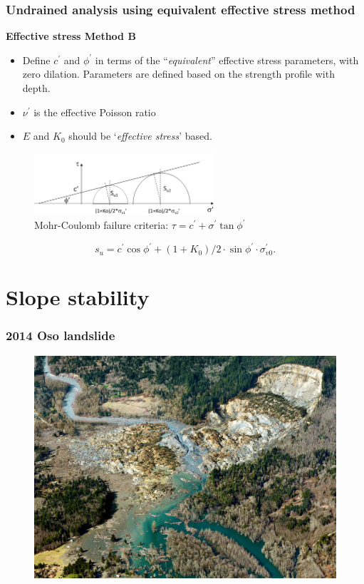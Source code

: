 \documentclass[notes]{beamer}
\begin{document}
\begin{frame}
\frametitle{Undrained analysis using equivalent effective stress method}
\textbf{Effective stress Method B}
\begin{itemize}
	\item Define $c^\prime$ and $\phi^\prime$ in terms of the ``\textit{equivalent}'' effective stress parameters, with zero dilation. Parameters are defined based on the strength profile with depth.
	\item $\nu^\prime$ is the effective Poisson ratio
	\item $E$ and $K_0$ should be `\textit{effective stress}' based.
\end{itemize}
\begin{figure}
	\includegraphics[width=0.6\textwidth]{figs/su-total.png}
	\caption*{Mohr-Coulomb failure criteria: $\tau = c^\prime + \sigma^\prime \tan \phi^\prime$}
\end{figure}
\begin{equation*}
s_u = c^\prime \cos \phi^\prime + (1+K_0)/2 \cdot \sin \phi^\prime \cdot \sigma_{v0}^\prime.
\end{equation*}
\end{frame}

\section{Slope stability}
\begin{frame}
\frametitle{2014 Oso landslide}
\begin{figure}[ht]
	\centering
	\includegraphics[width=\textwidth]{figs/oso-mudslide.jpg}
\end{figure}
\end{frame}
\end{document}
